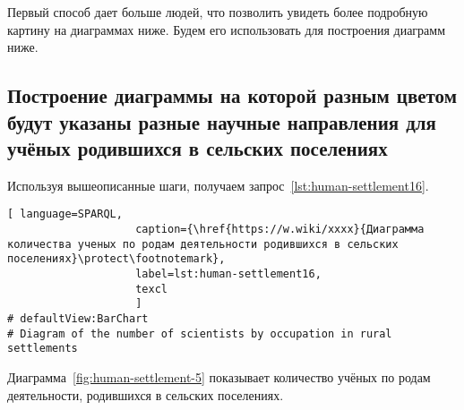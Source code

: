 Первый способ дает больше людей, что позволить увидеть более подробную картину на диаграммах ниже. Будем его использовать для построения диаграмм ниже.

\subsection{Построение диаграммы на которой разным цветом будут указаны разные научные направления для учёных родившихся в сельских поселениях}

Используя вышеописанные шаги, получаем запрос~\protect\ref{lst:human-settlement16}.


\begin{lstlisting}[ language=SPARQL, 
                    caption={\href{https://w.wiki/xxxx}{Диаграмма количества ученых по родам деятельности родившихся в сельских поселениях}\protect\footnotemark},
                    label=lst:human-settlement16,
                    texcl 
                    ]
# defaultView:BarChart
# Diagram of the number of scientists by occupation in rural settlements

\end{lstlisting}%

Диаграмма~\ref{fig:human-settlement-5} показывает количество учёных по родам деятельности, 
родившихся в сельских поселениях.

\begin{figure*}
    \setlength{\fboxsep}{0pt}%
    \setlength{\fboxrule}{1pt}%
	\label{fig:human-settlement-5}
	\caption[Диаграмма количества ученых по родам деятельности родившихся в сельских поселениях.]{Диаграмма количества ученых по родам деятельности родившихся в сельских поселениях. Ссылка на SPARQL-запрос: \href{https://w.wiki/xxxx}{https://w.wiki/xxxx}.}%
\end{figure*} 


